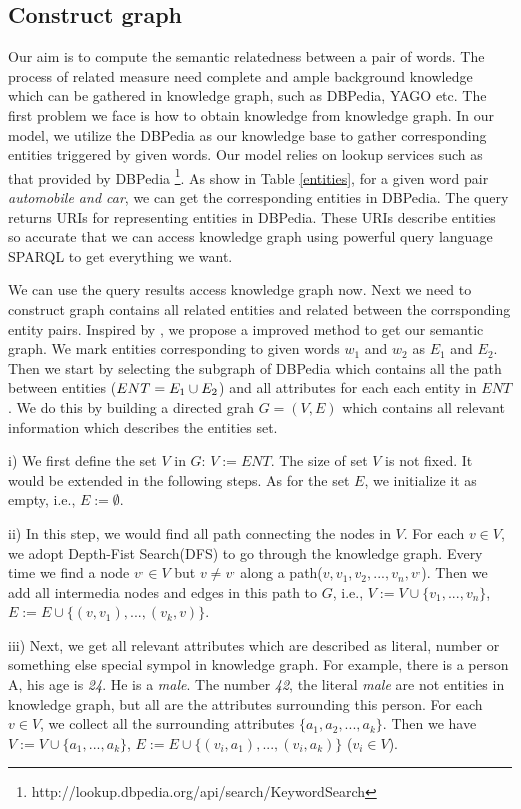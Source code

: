 \subsection{Construct graph}
Our aim is to compute the semantic relatedness between a pair of words. The process of related measure
need complete and ample background knowledge which can be gathered in knowledge graph, such as DBPedia, YAGO etc.
The first problem we face is how to obtain knowledge from knowledge graph. In our model, we utilize the DBPedia as
our knowledge base to gather corresponding entities triggered by given words. Our model relies on lookup
services such as that provided by DBPedia \footnote{http://lookup.dbpedia.org/api/search/KeywordSearch}. As show 
in Table \ref{entities}, for a given word pair \emph{automobile and car}, 
we can get the corresponding entities in DBPedia. The query returns URIs for representing entities in DBPedia. 
These URIs describe entities so accurate that we can access knowledge graph using powerful query language SPARQL 
to get everything we want.

We can use the query results access knowledge graph now. Next we need to construct graph 
contains all related entities and related between the corrsponding entity pairs. Inspired by \cite{aaai/NavigliP12},
we propose a improved method to get our semantic graph. We mark entities corresponding to
given words \emph{$w_1$} and \emph{$w_2$} as \emph{$E_1$} and \emph{$E_2$}. 
Then we start by selecting the subgraph of DBPedia which contains all the path between entities
($ENT = \emph{$E_1$} \cup \emph{$E_2$}$) and all attributes for each each entity in $ENT$. We do 
this by building a directed grah ${G = (V, E)}$ which contains all relevant information which describes
the entities set.

i) We first define the set $V$ in $G$: $V:=ENT$. 
The size of set $V$ is not fixed. It would be extended in the following steps.
As for the set $E$, we initialize it as empty, i.e., $E:=\emptyset$.

ii) In this step, we would find all path connecting the nodes in $V$. For each $v \in V$, 
we adopt Depth-Fist Search(DFS) to go through the knowledge graph. Every time we find a node
$v^, \in V$ but $v \ne v^,$ along a path($v, v_1, v_2,...,v_n, v^,$). Then we add all intermedia 
nodes and edges in this path to $G$, i.e., $V:=V \cup \{v_1, ..., v_n\}$, 
$E:=E \cup \{(v, v_1), ..., (v_k, v)\}$.

iii) Next, we get all relevant attributes which are described as literal, number or something 
else special sympol in knowledge graph. For example, there is a person A, his age is \emph{24}. He is a \emph{male}.
The number \emph{42}, the literal \emph{male} are not entities in knowledge graph,
but all are the attributes surrounding this person.
For each $v \in V$, we collect all the surrounding attributes 
$\{a_1, a_2, ..., a_k\}$. Then we have $V:=V \cup \{a_1, ..., a_k\}$, 
$E:=E \cup \{(v_i, a_1), ..., (v_i, a_k)\}$ ($v_i \in V$).

